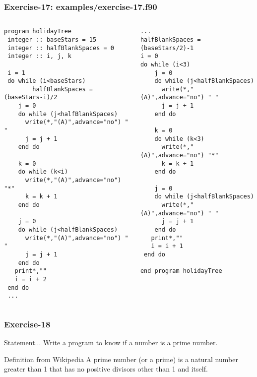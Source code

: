 \documentclass[xcolor=dvipsnames,dvip,notes=show,table]{beamer}
\begin{document}
\begin{frame}[fragile]
\frametitle{Exercise-17: examples/exercise-17.f90}
\tiny

\begin{columns}[c] %

\begin{lstlisting}
program holidayTree
 integer :: baseStars = 15
 integer :: halfBlankSpaces = 0
 integer :: i, j, k

 i = 1
 do while (i<baseStars)
        halfBlankSpaces = (baseStars-i)/2
	j = 0  
	do while (j<halfBlankSpaces)
	  write(*,"(A)",advance="no") " "
	  j = j + 1
	end do

	k = 0  
	do while (k<i)
	  write(*,"(A)",advance="no") "*"
	  k = k + 1
	end do

	j = 0  
	do while (j<halfBlankSpaces)
	  write(*,"(A)",advance="no") " "
	  j = j + 1
	end do
   print*,""
   i = i + 2
 end do
 ...
\end{lstlisting}




\begin{lstlisting}
...
halfBlankSpaces = (baseStars/2)-1
i = 0
do while (i<3)
	j = 0  
	do while (j<halfBlankSpaces)
	  write(*,"(A)",advance="no") " "
	  j = j + 1
	end do

	k = 0  
	do while (k<3)
	  write(*,"(A)",advance="no") "*"
	  k = k + 1
	end do

	j = 0  
	do while (j<halfBlankSpaces)
	  write(*,"(A)",advance="no") " "
	  j = j + 1
	end do
   print*,""
   i = i + 1
 end do

end program holidayTree
\end{lstlisting}


\end{columns}

\end{frame}


\begin{frame}[fragile]
\frametitle{Exercise-18}
\begin{block}{Statement...}
Write a program to know if a number is a prime number.
\end{block}

\begin{exampleblock}{Definition from Wikipedia}
 A prime number (or a prime) is a natural number greater than 1 that has no positive divisors other than 1 and itself. 
\end{exampleblock}

\end{frame}
\end{document}
